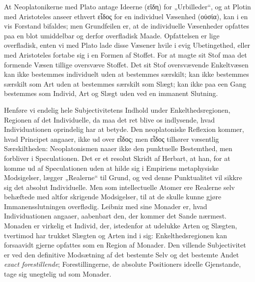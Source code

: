 \documentclass[12pt]{book}
\newcommand{\opage}[1]{\marginnote{\footnotesize\textit{[#1]}}}
\begin{document}
At Neoplatonikerne med Plato antage Ideerne (εἴδη) for „Urbilleder“, og at Plotin med Aristoteles anseer ethvert εἶδος for en individuel Væsenhed (οὐσία), kan i en vis Forstand bifaldes; men Grundfeilen er, at de individuelle Væsenheder opfattes paa en blot umiddelbar og derfor overfladisk
\opage{361}Maade. Opfattelsen er lige overfladisk, enten vi med Plato lade disse Væsener hvile i evig Ubetingethed, eller med Aristoteles fortabe sig i en Formen af Stoffet. For at magte sit Stof maa det formende Væsen tillige oversvæve Stoffet. Det sit Stof oversvævende Enkeltvæsen kan ikke bestemmes individuelt uden at bestemmes særskilt; kan ikke bestemmes særskilt som Art uden at bestemmes særskilt som Slægt; kan ikke paa een Gang bestemmes som Individ, Art og Slægt uden ved en immanent Slutning.

Henføre vi endelig hele Subjectivitetens Indhold under Enkelthedsregionen, Regionen af det Individuelle, da maa det ret blive os indlysende, hvad Individuationen oprindelig har at betyde. Den neoplatoniske Reflexion kommer, hvad Principet angaaer, ikke ud over εἶδος; men εἶδος tilhører væsentlig Særskiltheden: Neoplatonismen naaer ikke den punktuelle Bestemthed, men forbliver i Speculationen. Det er et resolut Skridt af Herbart, at han, for at komme ud af Speculationen uden at hilde sig i Empiriens metaphysiske Modsigelser, lægger „Realerne“ til Grund, og ved denne Punktualitet vil sikkre sig det absolut Individuelle. Men som intellectuelle Atomer ere Realerne selv behæftede med altfor skrigende Modsigelser, til at de skulle kunne gjøre Immanensslutningen overflødig. Leibniz med sine Monader er, hvad Individuationen angaaer, aabenbart den, der kommer det Sande nærmest. Monaden er virkelig et Individ, der, istedenfor at udelukke Arten og Slægten, tvertimod har trukket Slægten og Arten ind i sig: Enkelthedsregionen kan forsaavidt gjerne opfattes som en Region af Monader. Den villende Subjectivitet er ved den definitive Modsætning af det bestemte Selv og det bestemte Andet \emph{exact forestillende}; Forestillingerne, de absolute Positioners ideelle Gjenstande, tage sig unegtelig ud som Monader.
\end{document}
